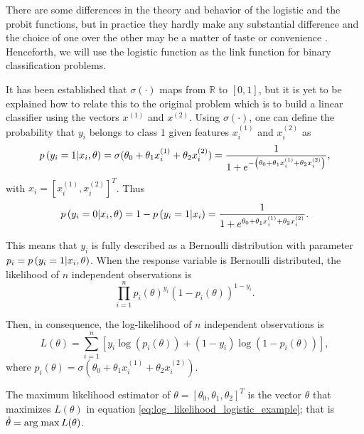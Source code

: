 There are some differences in the theory and behavior of the logistic and the probit functions, but in practice they hardly make any substantial difference and the choice of one over the other may be a matter of taste or convenience \cite[p.~118]{gelman2006data}. Henceforth, we will use the logistic function as the link function for binary classification problems.

It has been established that $\sigma \left( \cdot \right)$ maps from $\mathbb{R}$ to $\left[ 0,1 \right]$, but it is yet to be explained how to relate this to the original problem which is to build a linear classifier using the vectors $x^{(1)}$ and $x^{(2)}$. Using  $\sigma \left( \cdot \right)$, one can define the probability that $y_i$ belongs to class $1$ given features $x_i^{(1)}$ and $x_i^{(2)}$ as
\begin{equation}
  p\left( y_i = 1 | x_i, \theta \right) = \sigma(\theta_0 + \theta_1 x_i^{(1)} + \theta_2 x_i^{(2)}) = \frac{1}{1 + e^{-\left( \theta_0 + \theta_1 x_i^{(1)} + \theta_2 x_i^{(2)} \right)}},
\end{equation}
with $x_i = \left[ x_i^{(1)}, x_i^{(2)} \right]^T$. Thus
\begin{equation}
  p\left( y_i = 0 | x_i, \theta \right) = 1 - p\left( y_i = 1 | x_i \right) = \frac{1}{1 + e^{\theta_0 + \theta_1 x_i^{(1)} + \theta_2 x_i^{(2)}}}.
\end{equation}

This means that $y_i$ is fully described as a Bernoulli distribution with parameter $p_i =p\left( y_i = 1 | x_i, \theta \right)$. When the response variable is Bernoulli distributed, the likelihood of $n$ independent observations is
\begin{equation}
  \prod_{i = 1}^n  p_i(\theta)^{y_i}\left(1 - p_i(\theta) \right)^{1 - y_i}.
\end{equation}

Then, in consequence, the log-likelihood of $n$ independent observations is
\begin{equation}
  \label{eq:log_likelihood_logistic_example}
  L(\theta) = \sum_{i = 1}^n \left[ y_i \log\left( p_i(\theta) \right) + (1 - y_i) \log \left( 1 - p_i(\theta) \right) \right],
\end{equation}
where $p_i(\theta) = \sigma(\theta_0 + \theta_1 x_i^{(1)} + \theta_2 x_i^{(2)})$.

The maximum likelihood estimator of $\theta = \left[ \theta_0, \theta_1, \theta_2 \right]^T$ is the vector $\hat{\theta}$ that maximizes $L(\theta)$ in equation \eqref{eq:log_likelihood_logistic_example}; that is $\hat{\theta} = \operatorname*{arg\; max} L(\theta)$.

